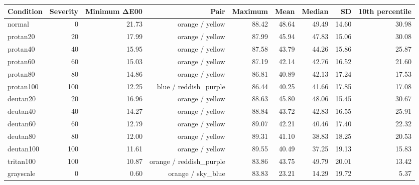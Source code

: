 \begin{tabular}{lrrrrrrrr}
\toprule
Condition & Severity & Minimum ΔE00 & Pair & Maximum & Mean & Median & SD & 10th percentile \\
\midrule
normal & 0 & 21.73 & orange / yellow & 88.42 & 48.64 & 49.49 & 14.60 & 30.98 \\
protan20 & 20 & 17.99 & orange / yellow & 87.99 & 45.94 & 47.83 & 15.06 & 30.08 \\
protan40 & 40 & 15.95 & orange / yellow & 87.58 & 43.79 & 44.26 & 15.86 & 25.87 \\
protan60 & 60 & 15.03 & orange / yellow & 87.19 & 42.14 & 42.76 & 16.52 & 21.60 \\
protan80 & 80 & 14.86 & orange / yellow & 86.81 & 40.89 & 42.13 & 17.24 & 17.53 \\
protan100 & 100 & 12.25 & blue / reddish\_purple & 86.44 & 40.25 & 41.66 & 17.85 & 17.08 \\
deutan20 & 20 & 16.96 & orange / yellow & 88.63 & 45.80 & 48.06 & 15.45 & 30.67 \\
deutan40 & 40 & 14.27 & orange / yellow & 88.84 & 43.72 & 42.83 & 16.55 & 25.91 \\
deutan60 & 60 & 12.79 & orange / yellow & 89.07 & 42.21 & 40.46 & 17.40 & 22.32 \\
deutan80 & 80 & 12.00 & orange / yellow & 89.31 & 41.10 & 38.83 & 18.25 & 20.53 \\
deutan100 & 100 & 11.61 & orange / yellow & 89.55 & 40.49 & 37.25 & 19.13 & 15.83 \\
tritan100 & 100 & 10.87 & orange / reddish\_purple & 83.86 & 43.75 & 49.79 & 20.01 & 13.42 \\
grayscale & 0 & 0.60 & orange / sky\_blue & 83.83 & 23.21 & 14.29 & 19.72 & 5.37 \\
\bottomrule
\end{tabular}
